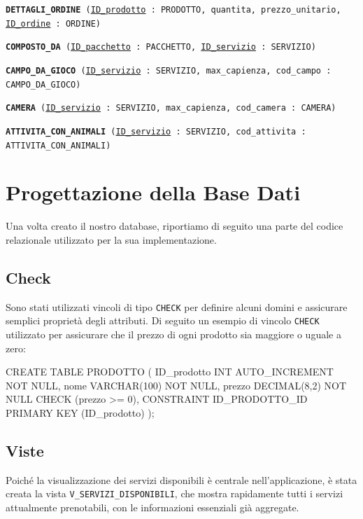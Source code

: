 \documentclass[a4paper,12pt]{report}
\begin{document}
\begin{description}
	\item\texttt{\textbf{DETTAGLI\_ORDINE} (\underline{ID\_prodotto} : PRODOTTO, quantita, prezzo\_unitario, \newline \underline{ID\_ordine} : ORDINE)}
	\item\texttt{\textbf{COMPOSTO\_DA} (\underline{ID\_pacchetto} : PACCHETTO, \underline{ID\_servizio} : SERVIZIO)}
	\item\texttt{\textbf{CAMPO\_DA\_GIOCO} (\underline{ID\_servizio} : SERVIZIO, max\_capienza, \newline cod\_campo : CAMPO\_DA\_GIOCO)}
	\item\texttt{\textbf{CAMERA} (\underline{ID\_servizio} : SERVIZIO, max\_capienza, cod\_camera : CAMERA)}
	\item\texttt{\textbf{ATTIVITA\_CON\_ANIMALI} (\underline{ID\_servizio} : SERVIZIO, \newline cod\_attivita : ATTIVITA\_CON\_ANIMALI)}
\end{description}

\chapter{Progettazione della Base Dati}
Una volta creato il nostro database, riportiamo di seguito una parte del codice relazionale utilizzato per la sua implementazione.

\section{Check}
Sono stati utilizzati vincoli di tipo \texttt{CHECK} per definire alcuni domini e assicurare semplici proprietà degli attributi.
Di seguito un esempio di vincolo \texttt{CHECK} utilizzato per assicurare che il prezzo di ogni prodotto sia maggiore o uguale a zero:

\begin{sqlcode}[caption={},label={lst:check}]
CREATE TABLE PRODOTTO (
	ID_prodotto INT AUTO_INCREMENT NOT NULL,
	nome VARCHAR(100) NOT NULL,
	prezzo DECIMAL(8,2) NOT NULL CHECK (prezzo >= 0),
	CONSTRAINT ID_PRODOTTO_ID PRIMARY KEY (ID_prodotto)
);
\end{sqlcode}

\section{Viste}
Poiché la visualizzazione dei servizi disponibili è centrale nell'applicazione, è stata creata la vista \texttt{V\_SERVIZI\_DISPONIBILI}, che
mostra rapidamente tutti i servizi attualmente prenotabili, con le informazioni essenziali già aggregate.
\end{document}
